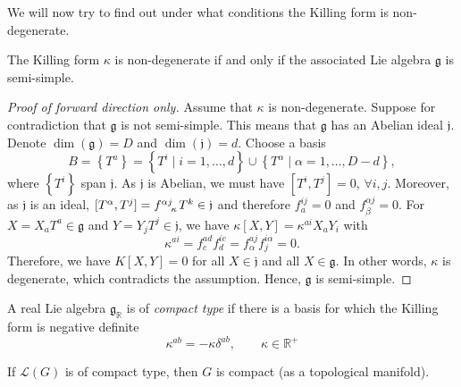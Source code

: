We will now try to find out under what conditions the Killing form is non-degenerate.
\begin{theorem}[Cartan]
  \label{thm:cartan}
  The Killing form $\kappa$ is non-degenerate if and only if the associated Lie algebra $\mathfrak{g}$ is semi-simple.
\end{theorem}
\begin{proof}[Proof of forward direction only]
  Assume that $\kappa$ is non-degenerate.
  Suppose for contradiction that $\mathfrak{g}$ is not semi-simple.
  This means that $\mathfrak{g}$ has an Abelian ideal $\mathfrak{j}$.
  Denote $\dim(\mathfrak{g}) = D$ and $\dim(\mathfrak{j}) = d$.
  Choose a basis
  \begin{equation}
    B = \left\{ T^{a} \right\} = \left\{ T^{i} \mid i = 1, \dots, d \right\} \cup \left\{ T^{\alpha} \mid \alpha =1, \dots, D-d \right\},
  \end{equation}
  where $\left\{ T^{i} \right\}$ span $\mathfrak{j}$. As $\mathfrak{j}$ is Abelian, we must have $[T^{i}, T^{j}] = 0$, $\forall i, j$.
  Moreover, as $\mathfrak{j}$ is an ideal, $[T^{\alpha}, T^{j}] = f \indices{^{\alpha j}_{\kappa}} T^{k} \in \mathfrak{j}$ and therefore $f^{ij}_{a} = 0$ and $f^{\alpha j}_{\beta} =0$.
  For $X = X_{a} T^{a} \in \mathfrak{g}$ and $Y = Y_{j} T^{j} \in \mathfrak{j}$, we have $\kappa[X, Y] = \kappa^{ai} X_{a} Y_{i}$ with
  \begin{equation}
    \kappa^{ai} = f^{ad}_{c} f^{ic}_{d} = f^{aj}_{\alpha} f^{i\alpha}_{j} = 0.
  \end{equation}
  Therefore, we have $K[X, Y] = 0$ for all $X \in \mathfrak{j}$ and all $X \in \mathfrak{g}$. In other words, $\kappa$ is degenerate, which contradicts the assumption.
  Hence, $\mathfrak{g}$ is semi-simple.
\end{proof}

\begin{definition}
  A real Lie algebra $\mathfrak{g}_{\mathbb{R}}$ is of \emph{compact type} if there is a basis for which the Killing form is negative definite
  \begin{equation}
    \kappa^{ab} = -\kappa \delta^{ab}, \qquad \kappa \in \mathbb{R}^+
  \end{equation}
\end{definition}

\begin{leftbar}
  \begin{claim}
    If $\mathscr{L}(G)$ is of compact type, then $G$ is compact (as a topological manifold).
  \end{claim}
\end{leftbar}


